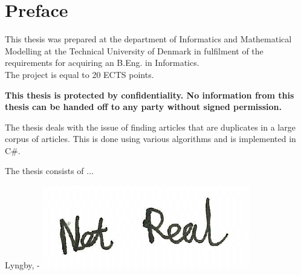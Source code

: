 \chapter{Preface}

This thesis was prepared at the department of Informatics and Mathematical Modelling at the Technical University of Denmark in fulfilment of the
requirements for acquiring an B.Eng. in Informatics. \\
The project is equal to 20 ECTS points.

\textbf{This thesis is protected by confidentiality. No information from this thesis can be handed off to any party without signed permission.}

The thesis deals with the issue of finding articles that are duplicates in a large corpus of articles. This is done using various algorithms and is implemented in C\#.

The thesis consists of ...
\vspace{20mm}
\begin{center}
    \hspace{20mm} Lyngby, \thesishandin-\thesisyear
    \vspace{5mm}
    \newline
    \includegraphics[scale=0.5]{figures/SignatureDummy}
\end{center}
\begin{flushright}
    \thesisauthor
\end{flushright}
